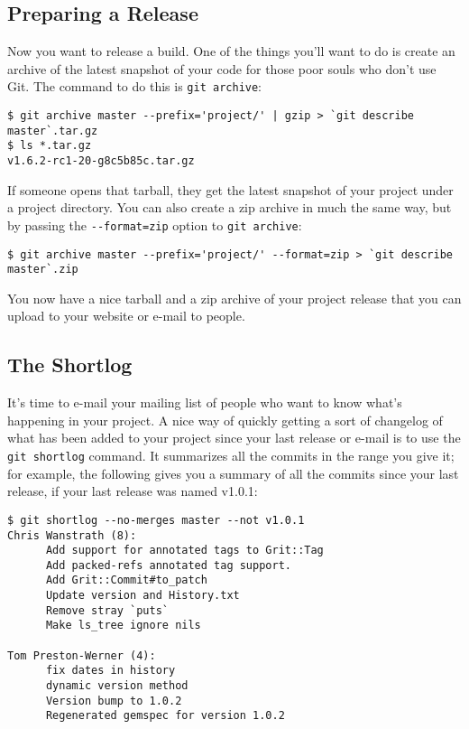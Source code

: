 \documentclass[a4paper]{book}
\begin{document}
\subsection{Preparing a Release}

Now you want to release a build. One of the things you'll want to do is create an archive of the latest snapshot of your code for those poor souls who don't use Git. The command to do this is \texttt{git archive}:

\begin{shaded}\begin{verbatim}
$ git archive master --prefix='project/' | gzip > `git describe master`.tar.gz
$ ls *.tar.gz
v1.6.2-rc1-20-g8c5b85c.tar.gz
\end{verbatim}\end{shaded}

If someone opens that tarball, they get the latest snapshot of your project under a project directory. You can also create a zip archive in much the same way, but by passing the \texttt{-{}-format=zip} option to \texttt{git archive}:

\begin{shaded}\begin{verbatim}
$ git archive master --prefix='project/' --format=zip > `git describe master`.zip
\end{verbatim}\end{shaded}

You now have a nice tarball and a zip archive of your project release that you can upload to your website or e-mail to people.

\subsection{The Shortlog}

It's time to e-mail your mailing list of people who want to know what's happening in your project. A nice way of quickly getting a sort of changelog of what has been added to your project since your last release or e-mail is to use the \texttt{git shortlog} command. It summarizes all the commits in the range you give it; for example, the following gives you a summary of all the commits since your last release, if your last release was named v1.0.1:

\begin{shaded}\begin{verbatim}
$ git shortlog --no-merges master --not v1.0.1
Chris Wanstrath (8):
      Add support for annotated tags to Grit::Tag
      Add packed-refs annotated tag support.
      Add Grit::Commit#to_patch
      Update version and History.txt
      Remove stray `puts`
      Make ls_tree ignore nils

Tom Preston-Werner (4):
      fix dates in history
      dynamic version method
      Version bump to 1.0.2
      Regenerated gemspec for version 1.0.2
\end{verbatim}\end{shaded}
\end{document}

